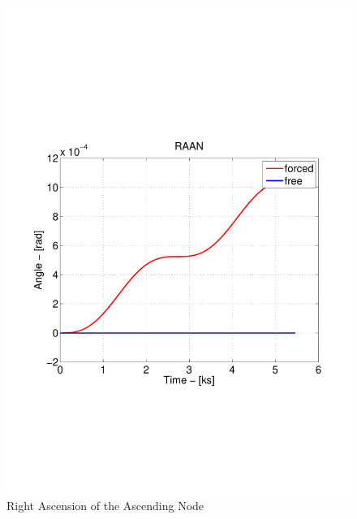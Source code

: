 \begin{figure}[h]
\begin{center}
  \includegraphics[width=\textwidth,clip=true,trim=1cm 6.5cm 1cm 8cm]
  {modelling/orbit_dynamics/image/RAAN.pdf}
  \caption{Right Ascension of the Ascending Node}
\end{center}
\end{figure}

